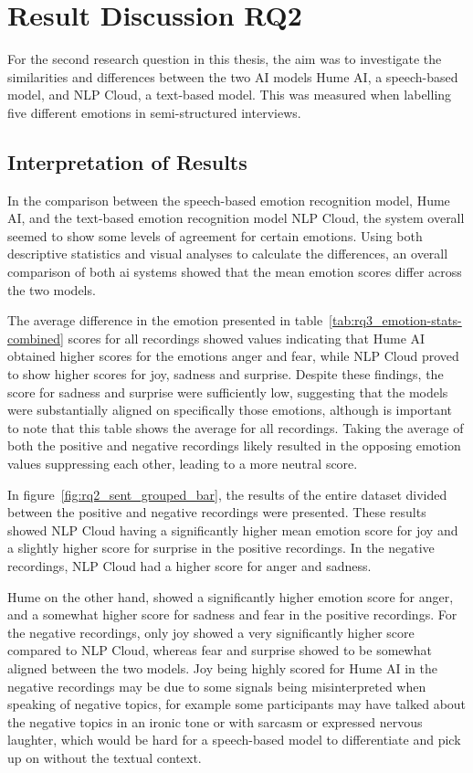 
\section{Result Discussion RQ2}
For the second research question in this thesis, the aim was to investigate the similarities and differences between the two AI models Hume AI, a speech-based model, and NLP Cloud, a text-based model. This was measured when labelling five different emotions in semi-structured interviews.

\subsection{Interpretation of Results}
\label{subsec:RQ2interpretation}
In the comparison between the speech-based emotion recognition model, Hume AI, and the text-based emotion recognition model NLP Cloud, the system overall seemed to show some levels of agreement for certain emotions. Using both descriptive statistics and visual analyses to calculate the differences, an overall comparison of both ai systems showed that the mean emotion scores differ across the two models.

The average difference in the emotion presented in table~\ref{tab:rq3_emotion-stats-combined} scores for all recordings showed values indicating that Hume AI obtained higher scores for the emotions anger and fear, while NLP Cloud proved to show higher scores for joy, sadness and surprise. Despite these findings, the score for sadness and surprise were sufficiently low, suggesting that the models were substantially aligned on specifically those emotions, although is important to note that this table shows the average for all recordings. Taking the average of both the positive and negative recordings likely resulted in the opposing emotion values suppressing each other, leading to a more neutral score.

In figure~\ref{fig:rq2_sent_grouped_bar}, the results of the entire dataset divided between the positive and negative recordings were presented. These results showed NLP Cloud having a significantly higher mean emotion score for joy and a slightly higher score for surprise in the positive recordings. In the negative recordings, NLP Cloud had a higher score for anger and sadness. 

Hume on the other hand, showed a significantly higher emotion score for anger, and a somewhat higher score for sadness and fear in the positive recordings. For the negative recordings, only joy showed a very significantly higher score compared to NLP Cloud, whereas fear and surprise showed to be somewhat aligned between the two models. Joy being highly scored for Hume AI in the negative recordings may be due to some signals being misinterpreted when speaking of negative topics, for example some participants may have talked about the negative topics in an ironic tone or with sarcasm or expressed nervous laughter, which would be hard for a speech-based model to differentiate and pick up on without the textual context.


